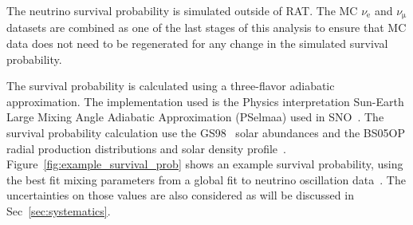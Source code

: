The neutrino survival probability is simulated outside of RAT\@.
The MC $\nu_{\mathrm{e}}$ and $\nu_{\mathrm{\mu}}$ datasets are combined
as one of the last stages of this analysis to ensure that MC data
does not need to be regenerated for any change in the simulated survival probability.

The survival probability is calculated using a three-flavor adiabatic approximation.
The implementation used is the Physics interpretation Sun-Earth Large Mixing Angle Adiabatic Approximation
(PSelmaa) used in SNO~\citep{nuno_thesis, sno_combined}.
The survival probability calculation use the GS98~\citep{gs98} solar abundances
and the BS05OP radial production distributions and solar density profile~\citep{bs_ssm}.
Figure~\ref{fig:example_survival_prob} shows an example survival probability, using the best fit mixing parameters
from a global fit to neutrino oscillation data~\citep{pdg_globalfit}.
The uncertainties on those values are also considered as will be discussed in
Sec~\ref{sec:systematics}.
